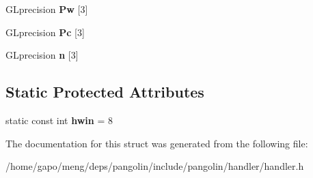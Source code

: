 \begin{DoxyCompactItemize}
\item 
G\+Lprecision {\bfseries Pw} \mbox{[}3\mbox{]}\hypertarget{structpangolin_1_1_handler3_d_a47843978f86d00d6260c1f68876217ab}{}\label{structpangolin_1_1_handler3_d_a47843978f86d00d6260c1f68876217ab}

\item 
G\+Lprecision {\bfseries Pc} \mbox{[}3\mbox{]}\hypertarget{structpangolin_1_1_handler3_d_a1f48117a4adc74babdf6361dc9d07d81}{}\label{structpangolin_1_1_handler3_d_a1f48117a4adc74babdf6361dc9d07d81}

\item 
G\+Lprecision {\bfseries n} \mbox{[}3\mbox{]}\hypertarget{structpangolin_1_1_handler3_d_a08dd6b6230dd714ce3071b0b94112c00}{}\label{structpangolin_1_1_handler3_d_a08dd6b6230dd714ce3071b0b94112c00}

\end{DoxyCompactItemize}
\subsection*{Static Protected Attributes}
\begin{DoxyCompactItemize}
\item 
static const int {\bfseries hwin} = 8\hypertarget{structpangolin_1_1_handler3_d_aef53600505d7706a0a191a87211da6ce}{}\label{structpangolin_1_1_handler3_d_aef53600505d7706a0a191a87211da6ce}

\end{DoxyCompactItemize}


The documentation for this struct was generated from the following file\+:\begin{DoxyCompactItemize}
\item 
/home/gapo/meng/deps/pangolin/include/pangolin/handler/handler.\+h\end{DoxyCompactItemize}
